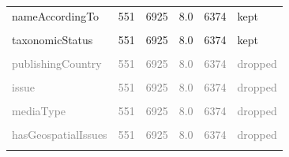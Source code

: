 \documentclass[sn-apa,pdflatex]{sn-jnl}
\begin{document}
\begin{longtable}[t]{lrrrrl}
nameAccordingTo & 551 & 6925 & 8.0 & 6374 & kept\\
\cellcolor{gray!10}{genericName} & \cellcolor{gray!10}{551} & \cellcolor{gray!10}{6925} & \cellcolor{gray!10}{8.0} & \cellcolor{gray!10}{6374} & \cellcolor{gray!10}{kept}\\
taxonomicStatus & 551 & 6925 & 8.0 & 6374 & kept\\
\addlinespace
\cellcolor{gray!10}{taxonRemarks} & \cellcolor{gray!10}{551} & \cellcolor{gray!10}{6925} & \cellcolor{gray!10}{8.0} & \cellcolor{gray!10}{6374} & \cellcolor{gray!10}{kept}\\
\textcolor{gray}{publishingCountry} & \textcolor{gray}{551} & \textcolor{gray}{6925} & \textcolor{gray}{8.0} & \textcolor{gray}{6374} & \textcolor{gray}{dropped}\\
\textcolor{gray}{\cellcolor{gray!10}{lastInterpreted}} & \textcolor{gray}{\cellcolor{gray!10}{551}} & \textcolor{gray}{\cellcolor{gray!10}{6925}} & \textcolor{gray}{\cellcolor{gray!10}{8.0}} & \textcolor{gray}{\cellcolor{gray!10}{6374}} & \textcolor{gray}{\cellcolor{gray!10}{dropped}}\\
\textcolor{gray}{issue} & \textcolor{gray}{551} & \textcolor{gray}{6925} & \textcolor{gray}{8.0} & \textcolor{gray}{6374} & \textcolor{gray}{dropped}\\
\textcolor{gray}{\cellcolor{gray!10}{nonTaxonomicIssue}} & \textcolor{gray}{\cellcolor{gray!10}{551}} & \textcolor{gray}{\cellcolor{gray!10}{6925}} & \textcolor{gray}{\cellcolor{gray!10}{8.0}} & \textcolor{gray}{\cellcolor{gray!10}{6374}} & \textcolor{gray}{\cellcolor{gray!10}{dropped}}\\
\addlinespace
\textcolor{gray}{mediaType} & \textcolor{gray}{551} & \textcolor{gray}{6925} & \textcolor{gray}{8.0} & \textcolor{gray}{6374} & \textcolor{gray}{dropped}\\
\textcolor{gray}{\cellcolor{gray!10}{hasCoordinate}} & \textcolor{gray}{\cellcolor{gray!10}{551}} & \textcolor{gray}{\cellcolor{gray!10}{6925}} & \textcolor{gray}{\cellcolor{gray!10}{8.0}} & \textcolor{gray}{\cellcolor{gray!10}{6374}} & \textcolor{gray}{\cellcolor{gray!10}{dropped}}\\
\textcolor{gray}{hasGeospatialIssues} & \textcolor{gray}{551} & \textcolor{gray}{6925} & \textcolor{gray}{8.0} & \textcolor{gray}{6374} & \textcolor{gray}{dropped}\\
\textcolor{gray}{\cellcolor{gray!10}{acceptedTaxonKey}} & \textcolor{gray}{\cellcolor{gray!10}{551}} & \textcolor{gray}{\cellcolor{gray!10}{6925}} & \textcolor{gray}{\cellcolor{gray!10}{8.0}} & \textcolor{gray}{\cellcolor{gray!10}{6374}} & \textcolor{gray}{\cellcolor{gray!10}{dropped}}\\

\end{longtable}
\end{document}
